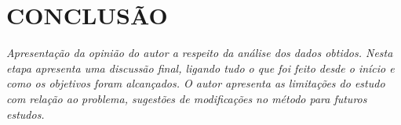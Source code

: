 \chapter{CONCLUSÃO}

\textit{Apresentação da opinião do autor a respeito da análise dos dados obtidos. Nesta etapa apresenta uma discussão final, ligando tudo o que foi feito desde o início e como os objetivos foram alcançados. O autor apresenta as limitações do estudo com relação ao problema, sugestões de modificações no método para futuros estudos.}